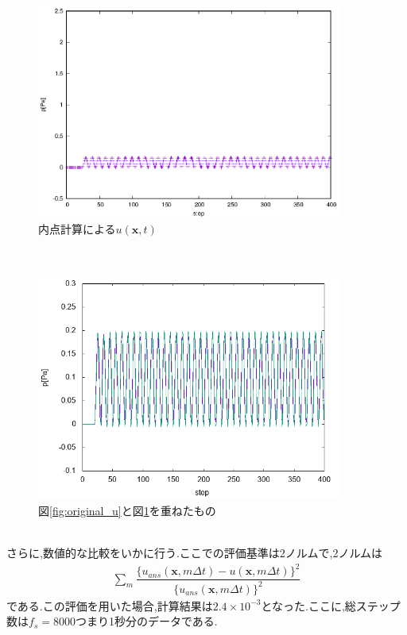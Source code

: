 \documentclass[dvipdfmx]{ampbt}
\begin{document}
\begin{figure}[H]
  \begin{center}
    \includegraphics[clip,width=10.0cm]{./eps/original_u.eps}
    \caption{内点計算による$u(\bm{x},t)$}
    \label{fig:naiten_u}
  \end{center}
\end{figure}\\
\begin{figure}[H]
  \begin{center}
    \includegraphics[clip,width=10.0cm]{./png/mix_u.png}
    \caption{図\ref{fig:original_u}と図\ref{fig:naiten_u}を重ねたもの}
    \label{fig:mix_u}
  \end{center}
\end{figure}\\

さらに,数値的な比較をいかに行う.ここでの評価基準は2ノルムで,2ノルムは
\begin{align}
\sum_m \dfrac{\{u_{ans}(\bm{x},m\Delta t)-u(\bm{x},m\Delta t)\}^2}{ \{u_{ans}(\bm{x},m\Delta t)\}^2 }
\end{align}
である.この評価を用いた場合,計算結果は$2.4 \times 10^{-3}$となった.ここに,総ステップ数は$f_s=8000$つまり1秒分のデータである.
\end{document}
